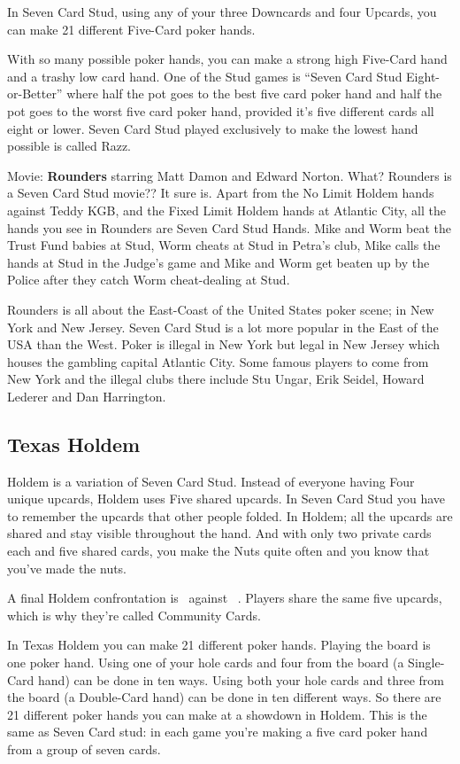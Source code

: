 In Seven Card Stud, using any of your three Downcards and four
Upcards, you can make 21 different Five-Card poker hands.

With so many possible poker hands, you can make a strong high
Five-Card hand and a trashy low card hand. One of the Stud games is
``Seven Card Stud Eight-or-Better'' where half the pot goes to the
best five card poker hand and half the pot goes to the worst five card
poker hand, provided it's five different cards all eight or lower.
Seven Card Stud played exclusively to make the lowest hand possible is
called Razz.

Movie: \textbf{Rounders} starring Matt Damon and Edward Norton.
What? Rounders is a Seven Card Stud movie?? It sure is. Apart from the
No Limit Holdem hands against Teddy KGB, and the Fixed Limit Holdem
hands at Atlantic City, all the hands you see in Rounders are Seven
Card Stud Hands. Mike and Worm beat the Trust Fund babies at Stud,
Worm cheats at Stud in Petra's club, Mike calls the hands at Stud in
the Judge's game and Mike and Worm get beaten up by the Police after
they catch Worm cheat-dealing at Stud.

Rounders is all about the East-Coast of the United States poker scene;
in New York and New Jersey. Seven Card Stud is a lot more
popular in the East of the USA than the West. Poker is illegal in
New York but legal in New Jersey which houses the gambling capital
Atlantic City. Some famous players to come from New York and the illegal
clubs there include Stu Ungar, Erik Seidel, Howard Lederer and Dan Harrington.

\subsection{Texas Holdem}

Holdem is a variation of Seven Card Stud. Instead of everyone
having Four unique upcards, Holdem uses Five shared upcards. In Seven
Card Stud you have to remember the upcards that other people
folded. In Holdem; all the upcards are shared and stay visible
throughout the hand. And with only two private cards each and five
shared cards, you make the Nuts quite often and you know that you've
made the nuts.

A final Holdem confrontation is
\back\back\nines\Qd\Jd\tres\fourc\ against
\back\back\nines\Qd\Jd\tres\fourc\ . Players share the same five
upcards, which is why they're called Community Cards.

In Texas Holdem you can make 21 different poker hands. Playing the
board is one poker hand. Using one of your hole cards and four from the
board (a Single-Card hand) can be done in ten ways. Using both your
hole cards and three from the board (a Double-Card hand) can be done
in ten different ways. So there are 21 different poker hands you can
make at a showdown in Holdem. This is the same as Seven Card
stud: in each game you're making a five card poker hand from a
group of seven cards.

